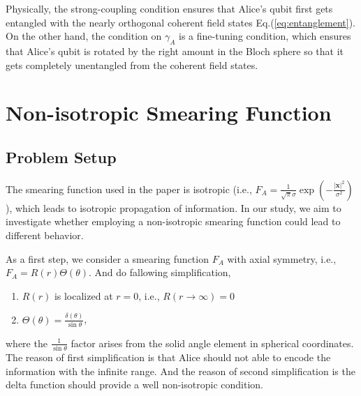 \documentclass[a4paper,12pt]{article}
\begin{document}
Physically, the strong-coupling condition ensures that Alice's qubit first gets entangled with the nearly orthogonal coherent field states Eq.(\ref{eq:entanglement}).
On the other hand, the condition on $\gamma_A$ is a fine-tuning condition, which ensures that Alice's qubit is rotated by the right amount in the Bloch sphere so that it gets completely unentangled from the coherent field states. 



\section{Non-isotropic Smearing Function}
\subsection{Problem Setup}
The smearing function used in the paper is isotropic (i.e., $F_A = \frac{1}{\sqrt{\pi}\sigma} \exp\left(-\frac{|\mathbf{x}|^2}{\sigma^2}\right)$), which leads to isotropic propagation of information. In our study, we aim to investigate whether employing a non-isotropic smearing function could lead to different behavior.

As a first step, we consider a smearing function $F_A$ with axial symmetry, i.e., $F_A = R(r)\Theta(\theta)$.
And do fallowing simplification, 
\begin{enumerate}
  \item $R(r)$ is localized at $r = 0$, i.e., $R(r \rightarrow \infty) = 0$
  \item $\Theta(\theta) = \frac{\delta(\theta)}{\sin{\theta}}$,
\end{enumerate}
where the $\frac{1}{\sin\theta}$ factor arises from the solid angle element in spherical coordinates.
The reason of first simplification is that Alice should not able to encode the information with the infinite range. And the reason of second simplification is the delta function should provide a well non-isotropic condition.
\end{document}
